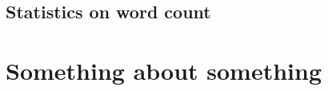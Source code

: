 \documentclass[times, twoside, watermark]{zHenriquesLab-StyleBioRxiv}
\begin{document}
\subsection*{Statistics on word count}
\detailtexcount
\newpage

\captionsetup*{format=largeformat}
\section{Something about something} \label{note:Note1} 
\Blindtext

\end{document}
